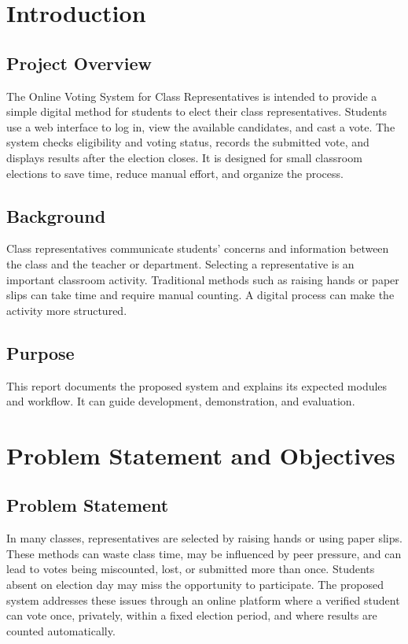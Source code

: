 \documentclass[12pt,a4paper]{report}
\begin{document}
\chapter{Introduction}
\section{Project Overview}
The Online Voting System for Class Representatives is intended to provide a simple digital method for students to elect their class representatives. Students use a web interface to log in, view the available candidates, and cast a vote. The system checks eligibility and voting status, records the submitted vote, and displays results after the election closes. It is designed for small classroom elections to save time, reduce manual effort, and organize the process.
\section{Background}
Class representatives communicate students' concerns and information between the class and the teacher or department. Selecting a representative is an important classroom activity. Traditional methods such as raising hands or paper slips can take time and require manual counting. A digital process can make the activity more structured.
\section{Purpose}
This report documents the proposed system and explains its expected modules and workflow. It can guide development, demonstration, and evaluation.

\chapter{Problem Statement and Objectives}
\section{Problem Statement}
In many classes, representatives are selected by raising hands or using paper slips. These methods can waste class time, may be influenced by peer pressure, and can lead to votes being miscounted, lost, or submitted more than once. Students absent on election day may miss the opportunity to participate. The proposed system addresses these issues through an online platform where a verified student can vote once, privately, within a fixed election period, and where results are counted automatically.
\end{document}
